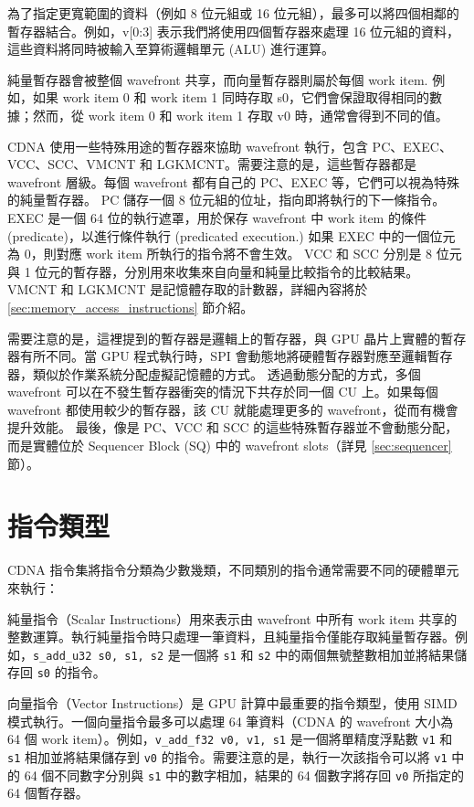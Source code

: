 為了指定更寬範圍的資料（例如 8 位元組或 16 位元組），最多可以將四個相鄰的暫存器結合。例如，v[0:3] 表示我們將使用四個暫存器來處理 16 位元組的資料，這些資料將同時被輸入至算術邏輯單元 (ALU) 進行運算。

純量暫存器會被整個 wavefront 共享，而向量暫存器則屬於每個 work item. 例如，如果 work item 0 和 work item 1 同時存取 s0，它們會保證取得相同的數據；然而，從 work item 0 和 work item 1 存取 v0 時，通常會得到不同的值。

CDNA 使用一些特殊用途的暫存器來協助 wavefront 執行，包含 PC、EXEC、VCC、SCC、VMCNT 和 LGKMCNT。需要注意的是，這些暫存器都是 wavefront 層級。每個 wavefront 都有自己的 PC、EXEC 等，它們可以視為特殊的純量暫存器。
PC 儲存一個 8 位元組的位址，指向即將執行的下一條指令。
EXEC 是一個 64 位的執行遮罩，用於保存 wavefront 中 work item 的條件 (predicate)，以進行條件執行 (predicated execution.) 如果 EXEC 中的一個位元為 0，則對應 work item 所執行的指令將不會生效。
VCC 和 SCC 分別是 8 位元與 1 位元的暫存器，分別用來收集來自向量和純量比較指令的比較結果。
VMCNT 和 LGKMCNT 是記憶體存取的計數器，詳細內容將於 \ref{sec:memory_access_instructions} 節介紹。

需要注意的是，這裡提到的暫存器是邏輯上的暫存器，與 GPU 晶片上實體的暫存器有所不同。當 GPU 程式執行時，SPI 會動態地將硬體暫存器對應至邏輯暫存器，類似於作業系統分配虛擬記憶體的方式。
透過動態分配的方式，多個 wavefront 可以在不發生暫存器衝突的情況下共存於同一個 CU 上。如果每個 wavefront 都使用較少的暫存器，該 CU 就能處理更多的 wavefront，從而有機會提升效能。
最後，像是 PC、VCC 和 SCC 的這些特殊暫存器並不會動態分配，而是實體位於 Sequencer Block (SQ) 中的 wavefront slots（詳見 \ref{sec:sequencer} 節）。


\section{指令類型}

CDNA 指令集將指令分類為少數幾類，不同類別的指令通常需要不同的硬體單元來執行：

純量指令（Scalar Instructions）用來表示由 wavefront 中所有 work item 共享的整數運算。執行純量指令時只處理一筆資料，且純量指令僅能存取純量暫存器。例如，\lstinline|s_add_u32 s0, s1, s2| 是一個將 \lstinline|s1| 和 \lstinline|s2| 中的兩個無號整數相加並將結果儲存回 \lstinline|s0| 的指令。

向量指令（Vector Instructions）是 GPU 計算中最重要的指令類型，使用 SIMD 模式執行。一個向量指令最多可以處理 64 筆資料（CDNA 的 wavefront 大小為 64 個 work item）。例如，\lstinline|v_add_f32 v0, v1, s1| 是一個將單精度浮點數 \lstinline|v1| 和 \lstinline|s1| 相加並將結果儲存到 \lstinline|v0| 的指令。需要注意的是，執行一次該指令可以將 \lstinline|v1| 中的 64 個不同數字分別與 \lstinline|s1| 中的數字相加，結果的 64 個數字將存回 \lstinline|v0| 所指定的 64 個暫存器。

